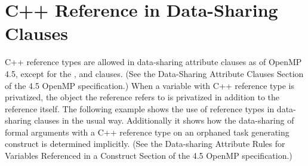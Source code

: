 \section{C++ Reference in Data-Sharing Clauses}
\cppspecificstart
\label{cpp_reference}

C++ reference types are allowed in data-sharing attribute clauses as of OpenMP 4.5, except
for the ,  and  clauses.  
(See the Data-Sharing Attribute Clauses Section of the 4.5 OpenMP specification.)
When a variable with C++ reference type is privatized, the object the reference refers to is privatized in addition to the reference itself.
The following example shows the use of reference types in data-sharing clauses in the usual way.
Additionally it shows how the data-sharing of formal arguments with a C++ reference type on an orphaned task generating construct is determined implicitly. (See the Data-sharing Attribute Rules for Variables Referenced in a Construct Section of the 4.5 OpenMP specification.)


\cppspecificend
